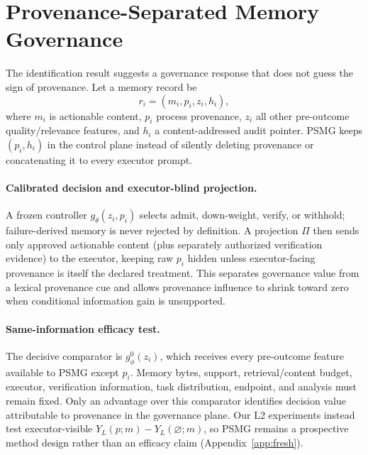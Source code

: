 \section{Provenance-Separated Memory Governance}
\label{sec:psmg}
The identification result suggests a governance response that does not guess the sign of provenance. Let a memory record be
\begin{equation}
r_i=(m_i,p_i,z_i,h_i),
\end{equation}
where $m_i$ is actionable content, $p_i$ process provenance, $z_i$ all other pre-outcome quality/relevance features, and $h_i$ a content-addressed audit pointer. PSMG keeps $(p_i,h_i)$ in the control plane instead of silently deleting provenance or concatenating it to every executor prompt.

\paragraph{Calibrated decision and executor-blind projection.}
A frozen controller $g_\theta(z_i,p_i)$ selects admit, down-weight, verify, or withhold; failure-derived memory is never rejected by definition. A projection $\Pi$ then sends only approved actionable content (plus separately authorized verification evidence) to the executor, keeping raw $p_i$ hidden unless executor-facing provenance is itself the declared treatment. This separates governance value from a lexical provenance cue and allows provenance influence to shrink toward zero when conditional information gain is unsupported.

\paragraph{Same-information efficacy test.}
The decisive comparator is $g^0_\phi(z_i)$, which receives every pre-outcome feature available to PSMG except $p_i$. Memory bytes, support, retrieval/content budget, executor, verification information, task distribution, endpoint, and analysis must remain fixed. Only an advantage over this comparator identifies decision value attributable to provenance in the governance plane. Our L2 experiments instead test executor-visible $Y_L(p;m)-Y_L(\varnothing;m)$, so PSMG remains a prospective method design rather than an efficacy claim (Appendix~\ref{app:fresh}).
